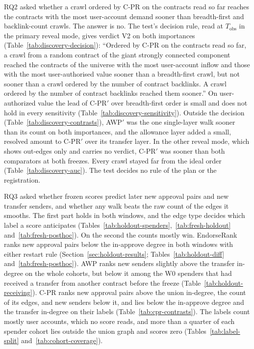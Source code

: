RQ2 asked whether a crawl ordered by \mbox{C-PR} on the contracts read so far reaches the contracts with the most user-account demand sooner than breadth-first and backlink-count crawls. The answer is no. The test's decision rule, read at $T_{\mathrm{obs}}$ in the primary reveal mode, gives verdict V2 on both importances (Table~\ref{tab:discovery-decision}): ``Ordered by \mbox{C-PR} on the contracts read so far, a crawl from a random contract of the giant strongly connected component reached the contracts of the universe with the most user-account inflow and those with the most user-authorised value sooner than a breadth-first crawl, but not sooner than a crawl ordered by the number of contract backlinks. A crawl ordered by the number of contract backlinks reached them sooner.'' On user-authorized value the lead of \mbox{C-PR}$'$ over breadth-first order is small and does not hold in every sensitivity (Table~\ref{tab:discovery-sensitivity}). Outside the decision (Table~\ref{tab:discovery-contrasts}), AWP$'$ was the one single-layer walk sooner than its count on both importances, and the allowance layer added a small, resolved amount to \mbox{C-PR}$'$ over its transfer layer. In the other reveal mode, which shows out-edges only and carries no verdict, \mbox{C-PR}$'$ was sooner than both comparators at both freezes. Every crawl stayed far from the ideal order (Table~\ref{tab:discovery-auc}). The test decides no rule of the plan or the registration.

RQ3 asked whether frozen scores predict later new approval pairs and new transfer senders, and whether any walk beats the raw count of the edges it smooths. The first part holds in both windows, and the edge type decides which label a score anticipates (Tables~\ref{tab:holdout-spenders},~\ref{tab:fresh-holdout} and~\ref{tab:fresh-posthoc}). On the second the counts mostly win. EndorseRank ranks new approval pairs below the in-approve degree in both windows with either restart rule (Section~\ref{sec:holdout-results}; Tables~\ref{tab:holdout-diff} and~\ref{tab:fresh-posthoc}). AWP ranks new senders slightly above the transfer in-degree on the whole cohorts, but below it among the W0 spenders that had received a transfer from another contract before the freeze (Table~\ref{tab:holdout-receiving}). \mbox{C-PR} ranks new approval pairs above the union in-degree, the count of its edges, and new senders below it, and lies below the in-approve degree and the transfer in-degree on their labels (Table~\ref{tab:cpr-contrasts}). The labels count mostly user accounts, which no score reads, and more than a quarter of each spender cohort lies outside the union graph and scores zero (Tables~\ref{tab:label-split} and~\ref{tab:cohort-coverage}).

